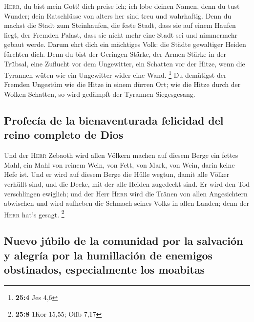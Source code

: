  \textsc{Herr}, du bist mein Gott! dich preise ich; ich
lobe deinen Namen, denn du tust Wunder; dein Ratschlüsse von alters her
sind treu und wahrhaftig.  Denn du machst die Stadt zum
Steinhaufen, die feste Stadt, dass sie auf einem Haufen liegt, der
Fremden Palast, dass sie nicht mehr eine Stadt sei und nimmermehr gebaut
werde.  Darum ehrt dich ein mächtiges Volk: die Städte
gewaltiger Heiden fürchten dich.  Denn du bist der
Geringen Stärke, der Armen Stärke in der Trübsal, eine Zuflucht vor dem
Ungewitter, ein Schatten vor der Hitze, wenn die Tyrannen wüten wie ein
Ungewitter wider eine Wand. \footnote{\textbf{25:4} Jes 4,6}
 Du demütigst der Fremden Ungestüm wie die Hitze in einem
dürren Ort; wie die Hitze durch der Wolken Schatten, so wird gedämpft
der Tyrannen Siegesgesang.

\hypertarget{profecuxeda-de-la-bienaventurada-felicidad-del-reino-completo-de-dios}{%
\subsection{Profecía de la bienaventurada felicidad del reino completo
de
Dios}\label{profecuxeda-de-la-bienaventurada-felicidad-del-reino-completo-de-dios}}

 Und der \textsc{Herr} Zebaoth wird allen Völkern machen
auf diesem Berge ein fettes Mahl, ein Mahl von reinem Wein, von Fett,
von Mark, von Wein, darin keine Hefe ist.  Und er wird auf
diesem Berge die Hülle wegtun, damit alle Völker verhüllt sind, und die
Decke, mit der alle Heiden zugedeckt sind.  Er wird den
Tod verschlingen ewiglich; und der Herr \textsc{Herr} wird die Tränen
von allen Angesichtern abwischen und wird aufheben die Schmach seines
Volks in allen Landen; denn der \textsc{Herr} hat's gesagt. \footnote{\textbf{25:8}
  1Kor 15,55; Offb 7,17}

\hypertarget{nuevo-juxfabilo-de-la-comunidad-por-la-salvaciuxf3n-y-alegruxeda-por-la-humillaciuxf3n-de-enemigos-obstinados-especialmente-los-moabitas}{%
\subsection{Nuevo júbilo de la comunidad por la salvación y alegría por
la humillación de enemigos obstinados, especialmente los
moabitas}\label{nuevo-juxfabilo-de-la-comunidad-por-la-salvaciuxf3n-y-alegruxeda-por-la-humillaciuxf3n-de-enemigos-obstinados-especialmente-los-moabitas}}


